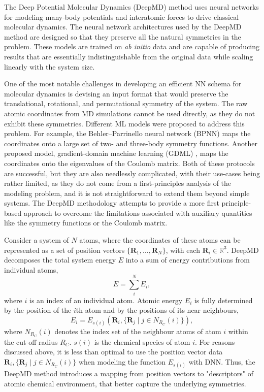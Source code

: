 The Deep Potential Molecular Dynamics (DeepMD) \parencite{Zhang_2018} method
uses neural networks for modeling many-body potentials and interatomic forces
to drive classical molecular dynamics. The neural network architectures used
by the DeepMD method are designed so that they preserve all the natural
symmetries in the problem. These models are trained on \textit{ab initio} data
and are capable of producing results that are essentially indistinguishable
from the original data while scaling linearly with the system size.

One of the most notable challenges in developing an efficient NN schema for
molecular dynamics is devising an input format that would preserve the
translational, rotational, and permutational symmetry of the system. The raw
atomic coordinates from MD simulations cannot be used directly, as they do not
exhibit these symmetries. Different ML models were proposed to address this
problem. For example, the Behler--Parrinello neural network (BPNN)
\parencite{PhysRevLett.98.146401} maps the coordinates onto a large set of
two- and three-body symmetry functions. Another proposed model,
gradient-domain machine learning (GDML)
\parencite{doi:10.1126/sciadv.1603015}, maps the coordinates onto the
eigenvalues of the Coulomb matrix. Both of these protocols are successful, but
they are also needlessly complicated, with their use-cases being rather
limited, as they do not come from a first-principles analysis of the modeling
problem, and it is not straightforward to extend them beyond simple systems.
The DeepMD methodology attempts to provide a more first principle-based
approach to overcome the limitations associated with auxiliary quantities like
the symmetry functions or the Coulomb matrix.

Consider a system of $N$ atoms, where the coordinates of these atoms can be
represented as a set of position vectors
$\{\mathbf{R}_1, \dots, \mathbf{R}_N\}$, with each
$\mathbf{R}_i \in \mathbb{R}^3$. DeepMD decomposes the total system energy $E$
into a sum of energy contributions from individual atoms,
\begin{equation}
  E = \sum_i^N E_i,
\end{equation}
where $i$ is an index of an individual atom. Atomic energy $E_i$ is fully
determined by the position of the $i$th atom and by the positions of its near
neighbours,
\begin{equation}
  E_i = E_{s(i)}(\mathbf{R}_i, \{\mathbf{R}_j \mid j \in  N_{R_C}(i)\}),
\end{equation}
where $N_{R_C}(i)$ denotes the index set of the neighbour atoms of atom $i$
within the cut-off radius $R_C$. $s(i)$ is the chemical species of atom $i$.
For reasons discussed above, it is less than optimal to use the position
vector data $\mathbf{R}_i, \{\mathbf{R}_j \mid j \in  N_{R_C}(i)\}$ when
modeling the function $E_{s(i)}$ with DNN. Thus, the DeepMD method introduces
a mapping from position vectors to "descriptors" of atomic chemical
environment, that better capture the underlying symmetries.

